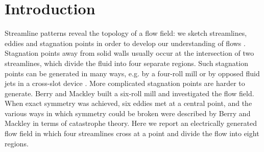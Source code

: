 \section{Introduction}

Streamline patterns reveal the topology of a flow field:
we sketch streamlines, eddies and stagnation points
in order to develop our understanding of flows
\cite{moffatt1964,jeffrey1980}.
Stagnation points away from solid walls usually occur at the intersection of
two streamlines, which divide the fluid into four separate regions.
Such stagnation points can be generated in many ways, e.g. by
a four-roll mill \cite{taylor1934} or by opposed fluid jets
in a cross-slot device \cite{scrivener1979,cachile2012}.
More complicated stagnation points are harder to generate.
Berry and Mackley \cite{berry1977} built  a six-roll mill and investigated
the flow field. When exact symmetry was achieved,
six eddies met at a central point, and the various ways in which
symmetry could be broken were described by Berry and Mackley
in terms of catastrophe theory. Here we report an electrically
generated flow
field in which four streamlines cross at a point and divide the flow into eight
regions.


